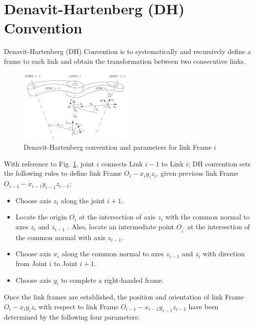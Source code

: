 \documentclass[10pt]{article}
\begin{document}
\section{Denavit-Hartenberg (DH) Convention}
 Denavit-Hartenberg (DH) Convention is to systematically and recursively define a frame to each link and obtain the transformation between two consecutive links.

\begin{figure}[H]
    \centering
   \includegraphics[max width=0.5\textwidth]{./kinematics/DH_convention}
    \caption{Denavit-Hartenberg convention and parameters for link Frame $i$}
    \label{c1.l2.dh}
\end{figure}







With reference to Fig. \ref{c1.l2.dh}, joint $i$ connects Link $i-1$ to Link $i$;   DH convention  sets the following rules to define link Frame $O_{i}-x_{i} y_{i} z_{i}$, given previous link Frame  $O_{i-1}-x_{i-1} y_{i-1} z_{i-1}$:

\begin{itemize}
  \item Choose axis $z_{i}$ along the joint $i+1$.

  \item Locate the origin $O_{i}$ at the intersection of axis $z_{i}$ with the common normal to axes $z_{i}$ and $z_{i-1}$ . Also, locate an intermediate point $O_{i^{\prime}}$ at the intersection of the common normal with axis $z_{i-1}$.

  \item Choose axis $x_{i}$ along the common normal to axes $z_{i-1}$ and $z_{i}$ with direction from Joint $i$ to Joint $i+1$.

  \item Choose axis $y_{i}$ to complete a right-handed frame.
\end{itemize}





\noindent
Once the link frames are established, the position and orientation of   link Frame $O_{i}-x_{i} y_{i} z_{i}$ with respect to link Frame  $O_{i-1}-x_{i-1} y_{i-1} z_{i-1}$ have been determined by the following four parameters:
\end{document}
